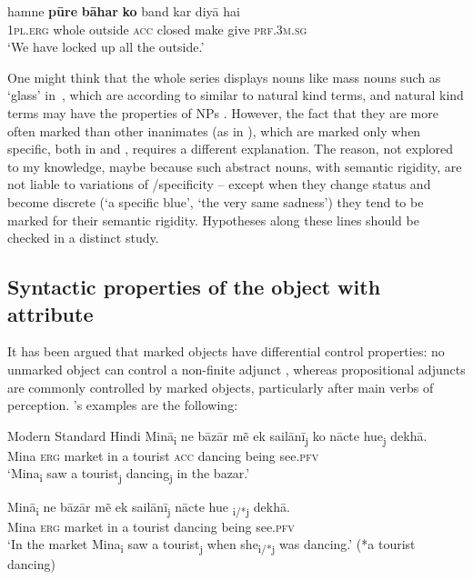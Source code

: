 \documentclass[output=paper]{LSP/langsci}
\begin{document}
\ex
\gll hamne \textbf{pūre} \textbf{bāhar} \textbf{ko} band kar diyā hai\\
\textsc{1pl.erg} whole outside \textsc{acc} closed make give \textsc{prf.3m.sg}\\
\glt ‘We have locked up all the outside.’ 
\z
\z

One might think that the whole series displays nouns like mass nouns such as ‘glass’ in~, which are according to \citet{Self2012Differential} similar to natural kind terms, and natural kind terms may have the properties of  NPs \citep{Gross2009Natural}. However, the fact that they are more often marked than other inanimates (as in ), which are marked only when specific, both in  and , requires a different explanation. The reason, not explored to my knowledge, maybe because such abstract nouns, with semantic rigidity, are not liable to variations of /specificity – except when they change status and become discrete (‘a specific blue’, ‘the very same sadness’) they tend to be marked for their semantic rigidity. Hypotheses along these lines should be checked in a distinct study.

\subsection{Syntactic properties of the object with attribute}
\label{10-mo-sec:2-3}

It has been argued that marked objects have differential control properties: no unmarked object can control a non-finite adjunct \citep{Bhatt2007Unaccusativity}, whereas propositional adjuncts are commonly controlled by marked objects, particularly after main verbs of perception. \citeauthor{Bhatt2007Unaccusativity}’s \citeyear{Bhatt2007Unaccusativity} examples are the following: 

\ea Modern Standard Hindi \citep[17]{Bhatt2007Unaccusativity} \label{10-mo-ex:10}
\ea \label{10-mo-ex:10a}
\gll Minā\textsubscript{i} ne bāzār mẽ ek sailānī\textsubscript{j} ko nācte hue\textsubscript{j} dekhā.\\
 Mina \textsc{erg} market in a tourist \textsc{acc} dancing being see.\textsc{pfv}\\
\glt ‘Mina\textsubscript{i} saw a tourist\textsubscript{j} dancing\textsubscript{j} in the bazar.’ 

\ex \label{10-mo-ex:10b}
\gll Minā\textsubscript{i} ne bāzār mẽ ek sailānī\textsubscript{j} nācte hue\textsubscript{ i/*j} dekhā.\\
 Mina \textsc{erg} market in a tourist dancing being see.\textsc{pfv}\\
\glt ‘In the market Mina\textsubscript{i} saw a tourist\textsubscript{j} when she\textsubscript{i/*j} was dancing.’ (*a tourist dancing) 
\z
\z
\end{document}
